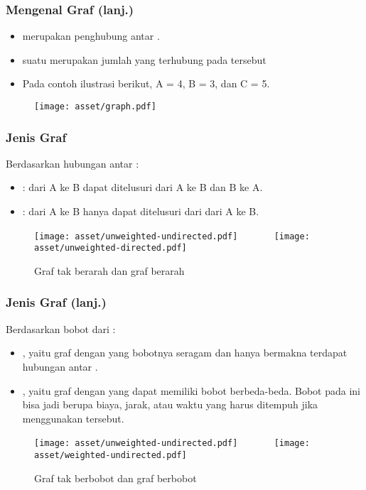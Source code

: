 \begin{frame}
\frametitle{Mengenal Graf (lanj.)}
\begin{itemize}
  \item \fEdge merupakan penghubung antar \fnode.
  \item \alert{\fDegree} suatu \fnode merupakan jumlah \fedge yang terhubung pada \fnode tersebut
  \item Pada contoh ilustrasi berikut, \fdegree \fnode A = 4, \fdegree \fnode B = 3, dan \fdegree \fnode C = 5.
\end{itemize}
\begin{figure}
  \centering
  \texttt{[image: asset/graph.pdf]}
\end{figure}
\end{frame}

\begin{frame}
\frametitle{Jenis Graf}
Berdasarkan hubungan antar \fnode:
\begin{itemize}
  \item {}: \fedge dari A ke B dapat ditelusuri dari A ke B dan B ke A. 
  \item {}: \fedge dari A ke B hanya dapat ditelusuri dari dari A ke B.
\end{itemize}
\begin{figure}
  \centering
  \texttt{[image: asset/unweighted-undirected.pdf]}
  \ \ \ \ \ \ %
  \texttt{[image: asset/unweighted-directed.pdf]}
  
  Graf tak berarah dan graf berarah
\end{figure}
\end{frame}

\begin{frame}
\frametitle{Jenis Graf (lanj.)}
Berdasarkan bobot dari \fedge:
\begin{itemize}
  \item {}, yaitu graf dengan \fedge yang bobotnya seragam dan hanya bermakna terdapat hubungan antar \fnode.
  \item {}, yaitu graf dengan \fedge yang dapat memiliki bobot berbeda-beda. Bobot pada \fedge ini bisa jadi berupa biaya, jarak, atau waktu yang harus ditempuh jika menggunakan \fedge tersebut.
\end{itemize}
\begin{figure}
  \centering
  \texttt{[image: asset/unweighted-undirected.pdf]}
  \ \ \ \ \ \ %
  \texttt{[image: asset/weighted-undirected.pdf]}
  
  Graf tak berbobot dan graf berbobot
\end{figure}
\end{frame}

